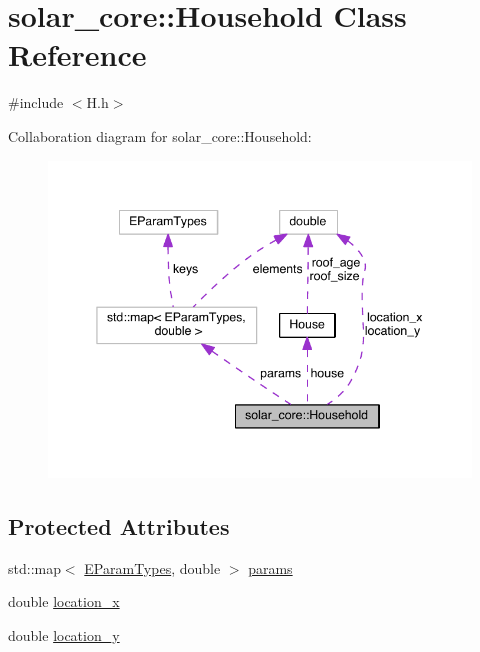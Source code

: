 \hypertarget{classsolar__core_1_1_household}{}\section{solar\+\_\+core\+:\+:Household Class Reference}
\label{classsolar__core_1_1_household}


{\ttfamily \#include $<$H.\+h$>$}



Collaboration diagram for solar\+\_\+core\+:\+:Household\+:\nopagebreak
\begin{figure}[H]
\begin{center}
\leavevmode
\includegraphics[width=345pt]{classsolar__core_1_1_household__coll__graph}
\end{center}
\end{figure}
\subsection*{Protected Attributes}
{\bf }\par
\begin{DoxyCompactItemize}
\item 
std\+::map$<$ \hyperlink{namespacesolar__core_aa1147341e5ef7a40d68d1bd68e149362}{E\+Param\+Types}, double $>$ \hyperlink{classsolar__core_1_1_household_a41d61dc3bab971cb19170341b77d9df8}{params}
\end{DoxyCompactItemize}

{\bf }\par
\begin{DoxyCompactItemize}
\item 
double \hyperlink{classsolar__core_1_1_household_a6596375631a366fdd24270f75548841f}{location\+\_\+x}
\item 
double \hyperlink{classsolar__core_1_1_household_a1ba6b7af82982096e05d99a70a2647eb}{location\+\_\+y}
\end{DoxyCompactItemize}


